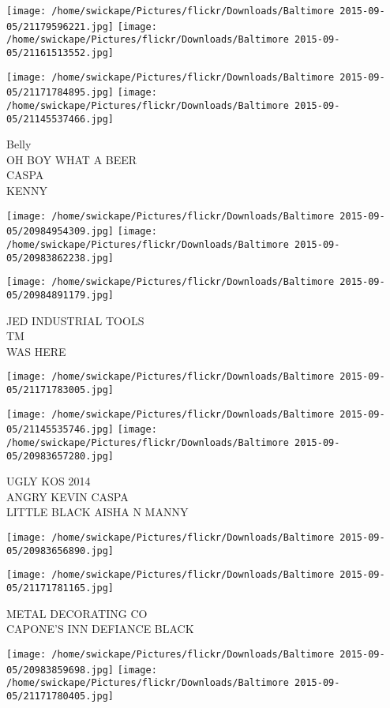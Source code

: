 \documentclass[10pt,letterpaper]{article}
\begin{document}
\texttt{[image: /home/swickape/Pictures/flickr/Downloads/Baltimore 2015-09-05/21179596221.jpg]}
\texttt{[image: /home/swickape/Pictures/flickr/Downloads/Baltimore 2015-09-05/21161513552.jpg]}

\texttt{[image: /home/swickape/Pictures/flickr/Downloads/Baltimore 2015-09-05/21171784895.jpg]}
\texttt{[image: /home/swickape/Pictures/flickr/Downloads/Baltimore 2015-09-05/21145537466.jpg]}

Belly\\
OH BOY WHAT A BEER\\
CASPA\\
KENNY
\pagebreak

\texttt{[image: /home/swickape/Pictures/flickr/Downloads/Baltimore 2015-09-05/20984954309.jpg]}
\texttt{[image: /home/swickape/Pictures/flickr/Downloads/Baltimore 2015-09-05/20983862238.jpg]}

\texttt{[image: /home/swickape/Pictures/flickr/Downloads/Baltimore 2015-09-05/20984891179.jpg]}

JED INDUSTRIAL TOOLS\\
TM\\
WAS HERE
\pagebreak

\texttt{[image: /home/swickape/Pictures/flickr/Downloads/Baltimore 2015-09-05/21171783005.jpg]}

\vspace{0.25in}
\texttt{[image: /home/swickape/Pictures/flickr/Downloads/Baltimore 2015-09-05/21145535746.jpg]}
\texttt{[image: /home/swickape/Pictures/flickr/Downloads/Baltimore 2015-09-05/20983657280.jpg]}

UGLY KOS 2014\\
ANGRY KEVIN CASPA\\
LITTLE BLACK AISHA N MANNY
\pagebreak

\texttt{[image: /home/swickape/Pictures/flickr/Downloads/Baltimore 2015-09-05/20983656890.jpg]}

\vspace{0.25in}
\texttt{[image: /home/swickape/Pictures/flickr/Downloads/Baltimore 2015-09-05/21171781165.jpg]}

METAL DECORATING CO\\
CAPONE'S INN DEFIANCE BLACK
\pagebreak

\texttt{[image: /home/swickape/Pictures/flickr/Downloads/Baltimore 2015-09-05/20983859698.jpg]}
\texttt{[image: /home/swickape/Pictures/flickr/Downloads/Baltimore 2015-09-05/21171780405.jpg]}
\end{document}
